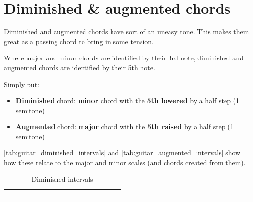 
\newpage

\section{Diminished \& augmented chords}

Diminished and augmented chords have sort of an uneasy tone. This makes them great as a passing chord to bring in some tension.

Where major and minor chords are identified by their 3rd note, diminished and augmented chords are identified by their 5th note.

Simply put:

\begin{itemize}
	\item \textbf{Diminished} chord: \textbf{minor} chord with the \textbf{5th lowered} by a half step (1 semitone)
	\item \textbf{Augmented} chord: \textbf{major} chord with the \textbf{5th raised} by a half step (1 semitone)
\end{itemize}

\autoref{tab:guitar_diminished_intervals} and \autoref{tab:guitar_augmented_intervals} show how these relate to the major and minor scales (and chords created from them).

\begin{table}[h]
	\centering
	\begin{NiceTabular}{*{17}{c}}
		\Block{}{} & \Block{}{} &  & &  & &  & &  & &  & &  & &  & & \Block{}{} \\
		 &  & &  & &  & &  & &  & &  & &  & &  & \\
		 &  & &  & &  & & \Block{}{} &  & & \Block{}{} &  & &  & &  &
	\end{NiceTabular}
	\caption{Diminished intervals}
	\label{tab:guitar_diminished_intervals}
\end{table}

